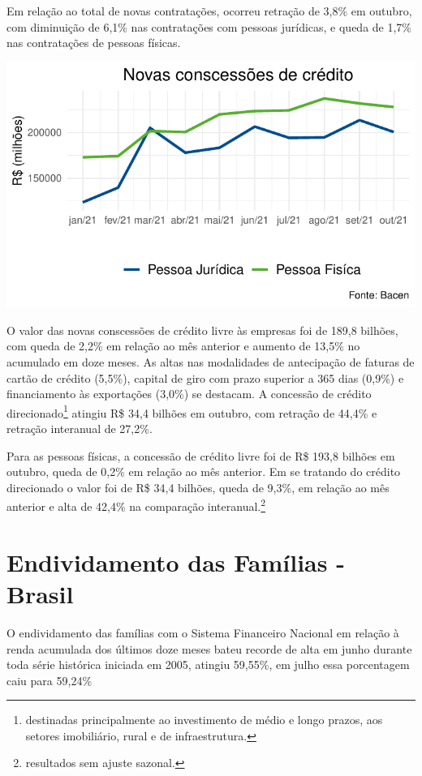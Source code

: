 \documentclass[100,a4paperpaper,]{article}
\begin{document}
Em relação ao total de novas contratações, ocorreu retração de 3,8\% em
outubro, com diminuição de 6,1\% nas contratações com pessoas jurídicas,
e queda de 1,7\% nas contratações de pessoas físicas.

\begin{center}\includegraphics{credito_files/figure-latex/novas conscessoes-1} \end{center}

O valor das novas conscessões de crédito livre às empresas foi de 189,8
bilhões, com queda de 2,2\% em relação ao mês anterior e aumento de
13,5\% no acumulado em doze meses. As altas nas modalidades de
antecipação de faturas de cartão de crédito (5,5\%), capital de giro com
prazo superior a 365 dias (0,9\%) e financiamento às exportações (3,0\%)
se destacam. A concessão de crédito
direcionado\footnote{destinadas principalmente ao investimento de médio e longo prazos, aos setores imobiliário, rural e de infraestrutura.}
atingiu R\$ 34,4 bilhões em outubro, com retração de 44,4\% e retração
interanual de 27,2\%.

Para as pessoas físicas, a concessão de crédito livre foi de R\$ 193,8
bilhões em outubro, queda de 0,2\% em relação ao mês anterior. Em se
tratando do crédito direcionado o valor foi de R\$ 34,4 bilhões, queda
de 9,3\%, em relação ao mês anterior e alta de 42,4\% na comparação
interanual.\footnote{resultados sem ajuste sazonal.}

\newpage
\section{Endividamento das Famílias - Brasil} 
 \vspace{0,15cm}

O endividamento das famílias com o Sistema Financeiro Nacional em
relação à renda acumulada dos últimos doze meses bateu recorde de alta
em junho durante toda série histórica iniciada em 2005, atingiu 59,55\%,
em julho essa porcentagem caiu para 59,24\%
\end{document}
